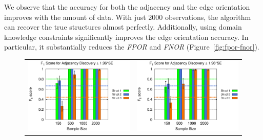 \documentclass{edm_template}
\begin{document}
{	%
	We observe that the accuracy for both the adjacency and the edge orientation  improves with the amount of data.
	With just 2000 observations, the algorithm can  recover the true structures almost perfectly.
	Additionally, using domain knowledge constraints significantly improves the edge orientation accuracy. 
	In particular, it substantially reduces the \emph{FPOR} and \emph{FNOR} (Figure~\ref{fig:fpor-fnor}). 
	
	\begin{figure}[!ht]
		\begin{center}
			\begin{tabular}{>{\centering}m{1.5in} >{\centering\arraybackslash}m{1.5in}}
				\includegraphics[width=1.1\linewidth]{figures/F1A_single.eps} &\includegraphics[width=1.1\linewidth]{figures/F1A_multi.eps}\\

\end{tabular}
\end{center}
\end{figure}}
\end{document}
